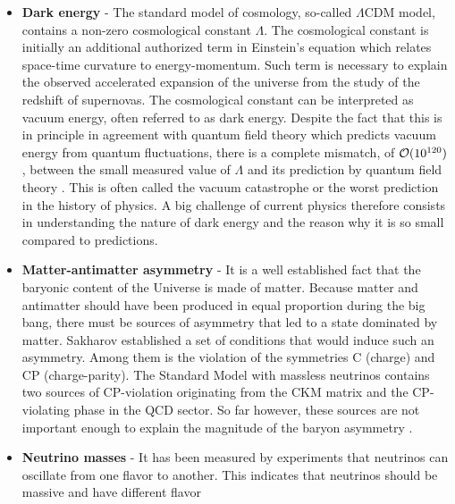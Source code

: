     \begin{itemize}
        \item \textbf{Dark energy} - The standard model of cosmology, so-called
            $\Lambda$CDM model, contains a non-zero cosmological constant
            $\Lambda$. The cosmological constant is initially an additional
            authorized term in Einstein's equation which relates space-time
            curvature to energy-momentum. Such term is necessary to explain the
            observed accelerated expansion of the universe from the study of the
            redshift of supernovas. The cosmological constant can be interpreted
            as vacuum energy, often referred to as dark energy. Despite the fact
            that this is in principle in agreement with quantum field theory
            which predicts vacuum energy from quantum fluctuations, there is a
            complete mismatch, of $\mathcal{O}(10^{120})$, between the small
            measured value of $\Lambda$ and its prediction by quantum field
            theory \cite{vacuumCatastrophe}. This is often called the vacuum
            catastrophe or the worst prediction in the history of physics. A big
            challenge of current physics therefore consists in understanding the
            nature of dark energy and the reason why it is so small compared to
            predictions.
        \item \textbf{Matter-antimatter asymmetry} - It is a well established
            fact that the baryonic content of the Universe is made of matter.
            Because matter and antimatter should have been produced in equal
            proportion during the big bang, there must be sources of asymmetry
            that led to a state dominated by matter. Sakharov \cite{Sakharov}
            established a set of conditions that would induce such an asymmetry.
            Among them is the violation of the symmetries C (charge) and CP
            (charge-parity). The Standard Model with massless neutrinos contains
            two sources of CP-violation originating from the CKM matrix and the
            CP-violating phase in the QCD sector. So far however, these sources
            are not important enough to explain the magnitude of the baryon
            asymmetry \cite{SMBaryogenesis}.
        \item \textbf{Neutrino masses} - It has been measured by experiments
            that neutrinos can oscillate from one flavor to another. This
            indicates that neutrinos should be massive and have different flavor

\end{itemize}
